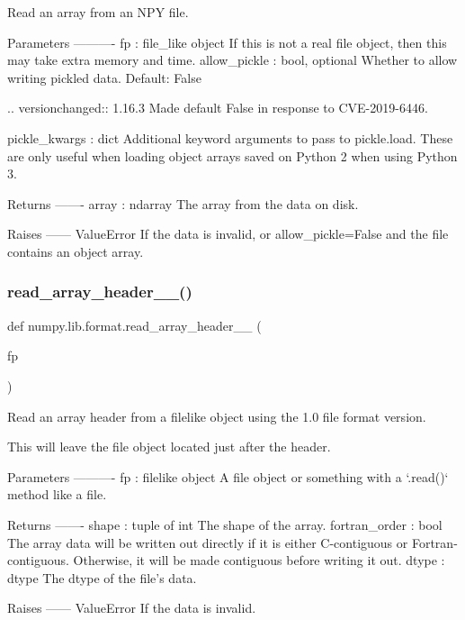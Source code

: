 \begin{DoxyVerb}Read an array from an NPY file.

Parameters
----------
fp : file_like object
    If this is not a real file object, then this may take extra memory
    and time.
allow_pickle : bool, optional
    Whether to allow writing pickled data. Default: False

    .. versionchanged:: 1.16.3
        Made default False in response to CVE-2019-6446.

pickle_kwargs : dict
    Additional keyword arguments to pass to pickle.load. These are only
    useful when loading object arrays saved on Python 2 when using
    Python 3.

Returns
-------
array : ndarray
    The array from the data on disk.

Raises
------
ValueError
    If the data is invalid, or allow_pickle=False and the file contains
    an object array.\end{DoxyVerb}
 \mbox{\label{namespacenumpy_1_1lib_1_1format_a96e510ed462ceebe504bf08d8fbf400b}} 
\subsubsection{\texorpdfstring{read\+\_\+array\+\_\+header\+\_\+\_()}{read\_array\_header\_1\_0()}}
{\footnotesize\ttfamily def numpy.\+lib.\+format.\+read\+\_\+array\+\_\+header\+\_\+\_ (\begin{DoxyParamCaption}\item[{}]{fp }\end{DoxyParamCaption})}

\begin{DoxyVerb}Read an array header from a filelike object using the 1.0 file format
version.

This will leave the file object located just after the header.

Parameters
----------
fp : filelike object
    A file object or something with a `.read()` method like a file.

Returns
-------
shape : tuple of int
    The shape of the array.
fortran_order : bool
    The array data will be written out directly if it is either
    C-contiguous or Fortran-contiguous. Otherwise, it will be made
    contiguous before writing it out.
dtype : dtype
    The dtype of the file's data.

Raises
------
ValueError
    If the data is invalid.\end{DoxyVerb}
 \mbox{\label{namespacenumpy_1_1lib_1_1format_a81839fc030545f78ce647bbc77ffae20}} 
